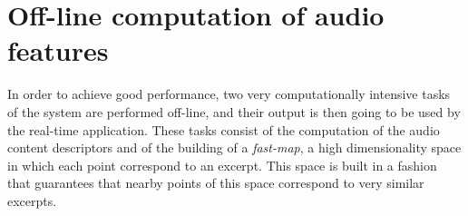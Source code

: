 \chapter{Off-line computation of audio features} %

\label{Chapter5} %

In order to achieve good performance, two very computationally intensive tasks of the system are performed off-line, and their output is then going to be used by the real-time application. These tasks consist of the computation of the audio content descriptors and of the building of a \textit{fast-map}, a high dimensionality space in which each point correspond to an excerpt. This space is built in a fashion that guarantees that nearby points of this space correspond to very similar excerpts.



